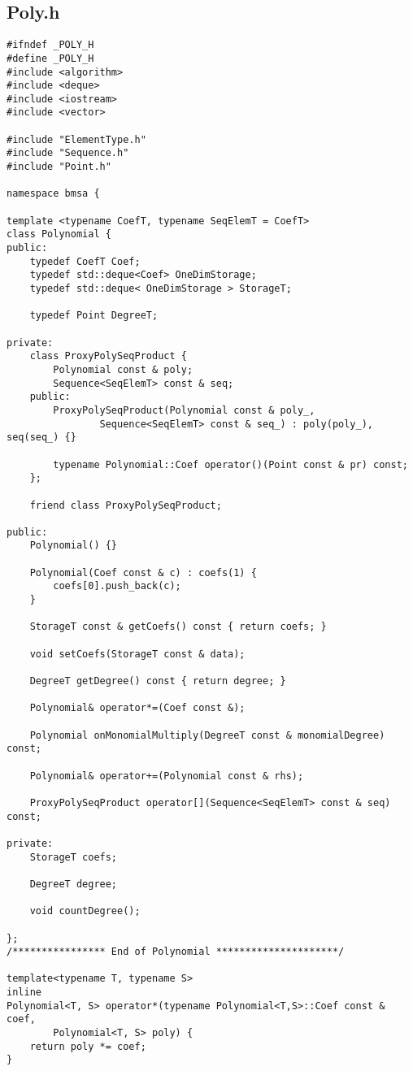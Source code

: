 \subsection*{Poly.h}
\begin{lstlisting}
#ifndef _POLY_H
#define _POLY_H
#include <algorithm>
#include <deque>
#include <iostream>
#include <vector>

#include "ElementType.h"
#include "Sequence.h"
#include "Point.h"

namespace bmsa {

template <typename CoefT, typename SeqElemT = CoefT>
class Polynomial {
public:
    typedef CoefT Coef;
    typedef std::deque<Coef> OneDimStorage;
    typedef std::deque< OneDimStorage > StorageT;

    typedef Point DegreeT;

private:
    class ProxyPolySeqProduct {
        Polynomial const & poly;
        Sequence<SeqElemT> const & seq;
    public:
        ProxyPolySeqProduct(Polynomial const & poly_,
                Sequence<SeqElemT> const & seq_) : poly(poly_), seq(seq_) {}

        typename Polynomial::Coef operator()(Point const & pr) const;
    };

    friend class ProxyPolySeqProduct;

public:
    Polynomial() {}

    Polynomial(Coef const & c) : coefs(1) {
        coefs[0].push_back(c);
    }

    StorageT const & getCoefs() const { return coefs; }

    void setCoefs(StorageT const & data);

    DegreeT getDegree() const { return degree; }

    Polynomial& operator*=(Coef const &);

    Polynomial onMonomialMultiply(DegreeT const & monomialDegree) const;

    Polynomial& operator+=(Polynomial const & rhs);

    ProxyPolySeqProduct operator[](Sequence<SeqElemT> const & seq) const;

private:
    StorageT coefs;

    DegreeT degree;

    void countDegree();

};
/**************** End of Polynomial *********************/

template<typename T, typename S>
inline
Polynomial<T, S> operator*(typename Polynomial<T,S>::Coef const & coef,
        Polynomial<T, S> poly) {
    return poly *= coef;
}


\end{lstlisting}
